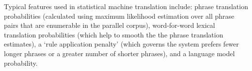 \documentclass[11pt]{article}
\newcommand{\mnote}[1]{\marginpar{%
  \vskip-\baselineskip
  \raggedright\footnotesize
  \itshape\hrule\smallskip\footnotesize{#1}\par\smallskip\hrule}}
\begin{document}
Typical features used in statistical machine translation include:
phrase translation probabilities (calculated using maximum likelihood
estimation over all phrase pairs that are enumerable in the parallel
corpus), word-for-word lexical translation probabilities (which help
to smooth the the phrase translation estimates), a `rule application
penalty' (which governs the system prefers fewer longer phrases or a
greater number of shorter phrases), and a language model probability.

  

\end{document}
